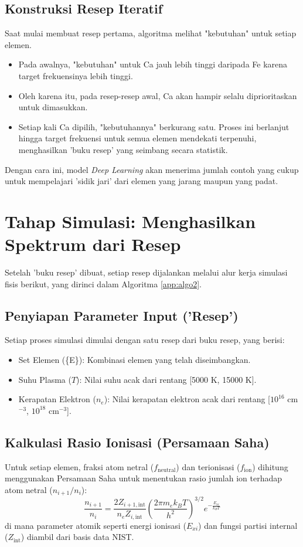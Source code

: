 \begin{onehalfspace}
\subsection*{Konstruksi Resep Iteratif}
Saat mulai membuat resep pertama, algoritma melihat "kebutuhan" untuk setiap elemen.
\begin{itemize}
    \item Pada awalnya, "kebutuhan" untuk Ca jauh lebih tinggi daripada Fe karena target frekuensinya lebih tinggi.
    \item Oleh karena itu, pada resep-resep awal, Ca akan hampir selalu diprioritaskan untuk dimasukkan.
    \item Setiap kali Ca dipilih, "kebutuhannya" berkurang satu. Proses ini berlanjut hingga target frekuensi untuk semua elemen mendekati terpenuhi, menghasilkan 'buku resep' yang seimbang secara statistik.
\end{itemize}
Dengan cara ini, model \textit{Deep Learning} akan menerima jumlah contoh yang cukup untuk mempelajari 'sidik jari' dari elemen yang jarang maupun yang padat.

\section*{Tahap Simulasi: Menghasilkan Spektrum dari Resep}
Setelah 'buku resep' dibuat, setiap resep dijalankan melalui alur kerja simulasi fisis berikut, yang dirinci dalam Algoritma \ref{app:algo2}.

\subsection*{Penyiapan Parameter Input ('Resep')}
Setiap proses simulasi dimulai dengan satu resep dari buku resep, yang berisi:
\begin{itemize}
    \item Set Elemen (\{E\}): Kombinasi elemen yang telah diseimbangkan.
    \item Suhu Plasma ($T$): Nilai suhu acak dari rentang [5000 K, 15000 K].
    \item Kerapatan Elektron ($n_e$): Nilai kerapatan elektron acak dari rentang [$10^{16}$ cm$^{-3}$, $10^{18}$ cm$^{-3}$].
\end{itemize}

\subsection*{Kalkulasi Rasio Ionisasi (Persamaan Saha)}
Untuk setiap elemen, fraksi atom netral ($f_{\text{neutral}}$) dan terionisasi ($f_{\text{ion}}$) dihitung menggunakan Persamaan Saha untuk menentukan rasio jumlah ion terhadap atom netral ($n_{i+1}/n_i$):
\begin{equation}
\frac{n_{i+1}}{n_i} = \frac{2Z_{i+1,\text{int}}}{n_e Z_{i,\text{int}}} \left( \frac{2\pi m_e k_B T}{h^2} \right)^{3/2} e^{-\frac{E_{xi}}{k_B T}}
\end{equation}
di mana parameter atomik seperti energi ionisasi ($E_{xi}$) dan fungsi partisi internal ($Z_{\text{int}}$) diambil dari basis data NIST.


\end{onehalfspace}
